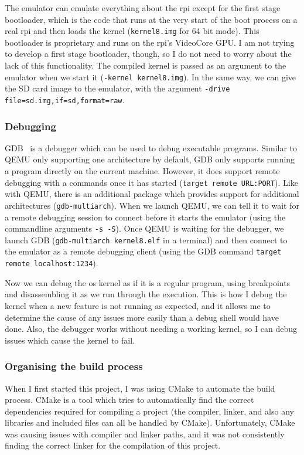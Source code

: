 \documentclass{article}
\begin{document}
The emulator can emulate everything about the \gls{rpi} except for the first
stage bootloader, which is the code that runs at the very start of the boot
process on a real \gls{rpi} and then loads the kernel (\texttt{kernel8.img}
for 64 bit mode). This bootloader is proprietary and runs on the \gls{rpi}'s
VideoCore GPU. I am not trying to develop a first stage bootloader, though, so
I do not need to worry about the lack of this functionality. The compiled
kernel is passed as an argument to the emulator when we start it
(\texttt{-kernel kernel8.img}). In the same way, we can give the SD card image
to the emulator, with the argument \texttt{-drive
file=sd.img,if=sd,format=raw}.

\subsubsection{Debugging}
GDB~\cite{gdb} is a debugger which can be used to debug executable programs.
Similar to QEMU only supporting one architecture by default, GDB only supports
running a program directly on the current machine. However, it does support
remote debugging with a commands once it has started (\texttt{target remote
URL:PORT}). Like with QEMU, there is an additional package which provides
support for additional architectures (\texttt{gdb-multiarch}). When we launch
QEMU, we can tell it to wait for a remote debugging session to connect before
it starts the emulator (using the commandline arguments \texttt{-s -S}). Once
QEMU is waiting for the debugger, we launch GDB (\texttt{gdb-multiarch
kernel8.elf} in a terminal) and then connect to the emulator as a remote
debugging client (using the GDB command \texttt{target remote localhost:1234}).

Now we can debug the \gls{os} kernel as if it is a regular program, using
breakpoints and disassembling it as we run through the execution. This is how I
debug the kernel when a new feature is not running as expected, and it allows
me to determine the cause of any issues more easily than a debug shell would
have done. Also, the debugger works without needing a working kernel, so I can
debug issues which cause the kernel to fail.

\subsubsection{Organising the build process}
When I first started this project, I was using CMake to automate the build
process. CMake is a tool which tries to automatically find the correct
dependencies required for compiling a project (the compiler, linker, and also
any libraries and included files can all be handled by CMake). Unfortunately,
CMake was causing issues with compiler and linker paths, and it was not
consistently finding the correct linker for the compilation of this project.
\end{document}
